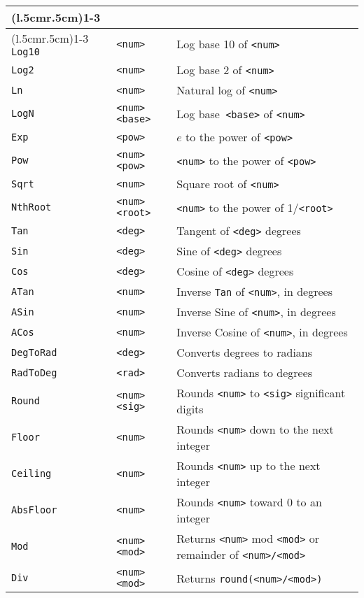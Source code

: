 \begin{longtable}{p{3cm}p{3cm}p{6cm}}
\bottomrule 
\endlastfoot 
\cmidrule(l{.5cm}r{.5cm}){1-3} 
\multicolumn{3}{c}{\textbf{Math Functions}}\\ 
\cmidrule(l{.5cm}r{.5cm}){1-3} 
\midrule
\verb+Log10+ &\verb+<num>+ &Log base 10 of \verb+<num>+\\ 
\verb+Log2+ &\verb+<num>+ &Log base 2 of \verb+<num>+ \\ 
\verb+Ln+ &\verb+<num>+ &Natural log of \verb+<num>+\\ 
\verb+LogN+ &\verb+<num> <base>+ &Log base\verb+ <base>+ of \verb+<num>+\\ 
\verb+Exp+ &\verb+<pow>+ &$e$ to the power of \verb+<pow>+ \\ 
\verb+Pow+ &\verb+<num> <pow>+ &\verb+<num>+ to the power of \verb+<pow>+\\ 
\verb+Sqrt+ &\verb+<num>+ &Square root of \verb+<num>+\\ 
\verb+NthRoot+ &\verb+<num> <root>+ &\verb+<num>+ to the power of 1/\verb+<root>+\\ 
\verb+Tan+ &\verb+<deg>+ &Tangent of \verb+<deg>+ degrees \\ 
\verb+Sin+ &\verb+<deg>+ &Sine of \verb+<deg>+ degrees \\ 
\verb+Cos+ &\verb+<deg>+ &Cosine of \verb+<deg>+ degrees \\ 
\verb+ATan+ &\verb+<num>+ &Inverse \verb+Tan+ of \verb+<num>+, in degrees\\ 
\verb+ASin+ &\verb+<num>+ &Inverse Sine of \verb+<num>+, in degrees\\ 
\verb+ACos+ &\verb+<num>+ &Inverse Cosine of \verb+<num>+, in degrees\\ 
\verb+DegToRad+ &\verb+<deg>+ &Converts degrees to radians\\ 
\verb+RadToDeg+ &\verb+<rad>+ &Converts radians to degrees\\ 
\verb+Round+ &\verb+<num> <sig>+ &Rounds \verb+<num>+ to \verb+<sig>+ significant digits\\ 
\verb+Floor+ &\verb+<num>+ &Rounds \verb+<num>+ down to the next integer\\ 
\verb+Ceiling+ &\verb+<num>+ &Rounds \verb+<num>+ up to the next integer\\ 
\verb+AbsFloor+ &\verb+<num>+ &Rounds \verb+<num>+ toward 0 to an integer\\ 
\verb+Mod+ &\verb+<num> <mod>+ &Returns \verb+<num>+ mod \verb+<mod>+ or remainder of \verb+<num>/<mod>+ \\ 
\verb+Div+ &\verb+<num> <mod>+ &Returns \verb+round(<num>/<mod>)+ \\ 

\end{longtable}
